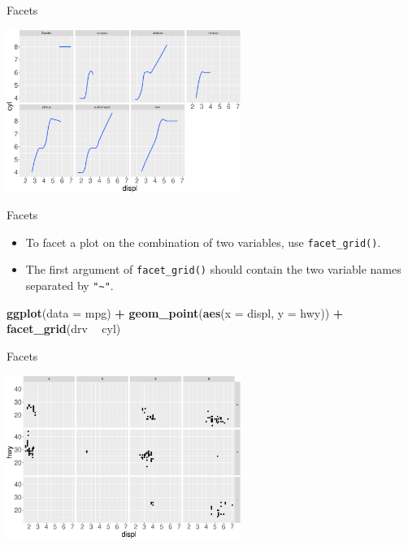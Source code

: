 \documentclass[ignorenonframetext,]{beamer}
\newenvironment{Shaded}{\begin{snugshade}}{\end{snugshade}}
\newcommand{\DataTypeTok}[1]{\textcolor[rgb]{0.13,0.29,0.53}{#1}}
\newcommand{\KeywordTok}[1]{\textcolor[rgb]{0.13,0.29,0.53}{\textbf{#1}}}
\newcommand{\NormalTok}[1]{#1}
\newcommand{\OperatorTok}[1]{\textcolor[rgb]{0.81,0.36,0.00}{\textbf{#1}}}
\newcommand{\StringTok}[1]{\textcolor[rgb]{0.31,0.60,0.02}{#1}}
\begin{document}
\begin{frame}{Facets}
\protect\hypertarget{facets-4}{}

\begin{center}\includegraphics[height=200px]{data-visualization_files/figure-beamer/unnamed-chunk-73-1} \end{center}

\end{frame}

\begin{frame}[fragile]{Facets}
\protect\hypertarget{facets-5}{}

\begin{itemize}
\item
  To facet a plot on the combination of two variables, use
  \texttt{facet\_grid()}.
\item
  The first argument of \texttt{facet\_grid()} should contain the two
  variable names separated by \texttt{"\textasciitilde{}"}.
\end{itemize}

\begin{Shaded}
\begin{Highlighting}[]
\KeywordTok{ggplot}\NormalTok{(}\DataTypeTok{data =}\NormalTok{ mpg) }\OperatorTok{+}\StringTok{ }
\StringTok{  }\KeywordTok{geom_point}\NormalTok{(}\KeywordTok{aes}\NormalTok{(}\DataTypeTok{x =}\NormalTok{ displ, }\DataTypeTok{y =}\NormalTok{ hwy)) }\OperatorTok{+}\StringTok{ }
\StringTok{  }\KeywordTok{facet_grid}\NormalTok{(drv }\OperatorTok{~}\StringTok{ }\NormalTok{cyl)}
\end{Highlighting}
\end{Shaded}

\end{frame}

\begin{frame}{Facets}
\protect\hypertarget{facets-6}{}

\begin{center}\includegraphics[height=200px]{data-visualization_files/figure-beamer/unnamed-chunk-75-1} \end{center}

\end{frame}
\end{document}
